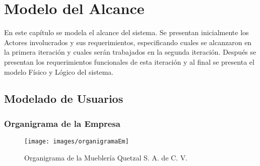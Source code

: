 \chapter{Modelo del Alcance}
\label{cap:reqUsr}

En este capítulo se modela el alcance del sistema. Se presentan inicialmente los Actores involucrados y sus requerimientos, especificando cuales se alcanzaron en la primera iteración y cuales serán trabajados en la segunda iteración. Después se presentan los requerimientos funcionales de esta iteración y al final se presenta el modelo Físico y Lógico del sistema.


\section{Modelado de Usuarios}

\subsection{Organigrama de la Empresa}



\begin{figure}[htbp]
	\begin{center}
		\texttt{[image: images/organigramaEm]}
		\caption{Organigrama de la Mueblería Quetzal S. A. de C. V.}
		\label{fig:organigrama}
	\end{center}
\end{figure}


